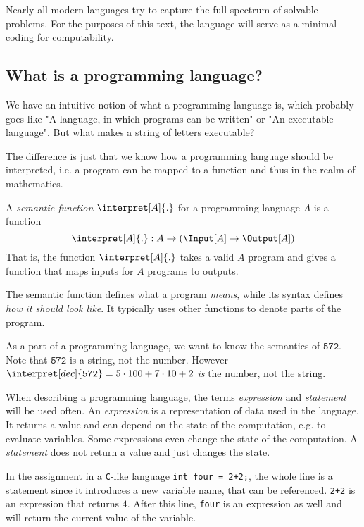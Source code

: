 Nearly all modern languages try to capture the full spectrum of solvable 
problems. For the purposes of this text, the \WHILE language will 
serve as a minimal coding for computability.

\subsection{What is a programming language?} %
\label{sub:What is a programming language}
We have an intuitive notion of what a programming language is, which probably 
goes like "A language, in which programs can be written" or "An 
executable language". But what makes a string of letters executable? 

The difference is just that we know how a programming language should be 
interpreted, i.e. a program can be mapped to a function and thus in the 
realm of mathematics.
\begin{defn}
	A {\em semantic function} $\interpret[A]{.}$ for a programming language $A$ is a function
	\[ \interpret[A]{.}: A \rightarrow \left( \Input[A] \rightarrow \Output[A]\right)\]
	That is, the function $\interpret[A]{.}$ takes a valid $A$ program and 
	gives a function that maps inputs for $A$ programs to outputs.
\end{defn}
The semantic function defines what a program {\em means}, while its syntax 
defines {\em how it should look like}. It typically uses other functions to 
denote parts of the program. 
\begin{example}
	As a part of a programming language, we want to know the semantics of 
	$\mathtt{572}$. Note that $\mathtt{572}$ is a string, not the number. However 
	$\interpret[dec]{\mathtt{572}}=5\cdot 100+7\cdot 10+ 2$ {\em is} the number, not the string. 
\end{example}

When describing a programming language, the terms {\em expression} and {\em
statement} will be used often. An {\em expression} is a representation of 
data used in the language. It returns a value and can depend on the state of 
the computation, e.g. to evaluate variables. Some expressions even change the 
state of the computation. A {\em statement} does not return a value and just 
changes the state.
\begin{example}
	In the assignment in a {\tt C}-like language {\tt int four = 2+2;}, the 
	whole line is a statement since it introduces a new variable name, that 
	can be referenced. {\tt 2+2} is an expression that returns $4$. After this 
	line, {\tt four} is an expression as well and will return the current value 
	of the variable.
\end{example}

